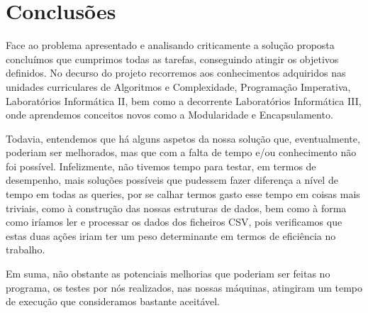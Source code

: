 \documentclass[a4paper]{article}
\begin{document}
\section{Conclusões}
\label{sec:conclusao}


Face ao problema apresentado e analisando criticamente a solução proposta concluímos
que cumprimos todas as tarefas, conseguindo atingir os objetivos definidos. No decurso
do projeto recorremos aos conhecimentos adquiridos nas unidades curriculares de
Algoritmos e Complexidade, Programação Imperativa, Laboratórios Informática II, bem como a decorrente Laboratórios Informática III, onde aprendemos conceitos novos como a Modularidade e Encapsulamento. \par
Todavia, entendemos que há alguns aspetos da nossa solução que, eventualmente,
poderiam ser melhorados, mas que com a falta de tempo e/ou conhecimento não foi possível. Infelizmente, não tivemos tempo para testar,
em termos de desempenho, mais soluções possíveis que pudessem fazer diferença
a nível de tempo em todas as queries, por se calhar termos gasto esse tempo em coisas mais triviais, como à construção das nossas estruturas de dados,
bem como à forma como iríamos ler e processar os dados dos ficheiros CSV, pois
verificamos que estas duas ações iriam ter um peso determinante em termos de
eficiência no trabalho. \par
Em suma, não obstante as potenciais melhorias que poderiam ser feitas no
programa, os testes por nós realizados, nas nossas máquinas, atingiram
um tempo de execução que consideramos bastante aceitável.

\pagebreak



\end{document}
